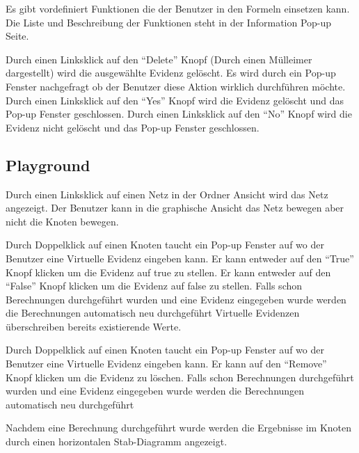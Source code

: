 \documentclass[parskip=full,11pt,twoside]{scrartcl}
\begin{document}
Es gibt vordefiniert Funktionen die der Benutzer in den Formeln einsetzen kann. Die Liste und Beschreibung der Funktionen steht in der Information Pop-up Seite.


Durch einen Linksklick auf den \enquote{Delete} Knopf (Durch einen Mülleimer dargestellt) wird die ausgewählte Evidenz gelöscht. Es wird durch ein Pop-up Fenster nachgefragt ob der Benutzer diese Aktion wirklich durchführen möchte.
Durch einen Linksklick auf den \enquote{Yes} Knopf wird die Evidenz gelöscht und das Pop-up Fenster geschlossen.
Durch einen Linksklick auf den \enquote{No} Knopf wird die Evidenz nicht gelöscht und das Pop-up Fenster geschlossen.

\subsection{Playground}

Durch einen Linksklick auf einen Netz in der Ordner Ansicht wird das Netz angezeigt. 
Der Benutzer kann in die graphische Ansicht das Netz bewegen aber nicht die Knoten bewegen.


Durch Doppelklick auf einen Knoten taucht ein Pop-up Fenster auf wo der Benutzer eine Virtuelle Evidenz eingeben kann.
Er kann entweder auf den \enquote{True} Knopf klicken um die Evidenz auf true zu stellen.
Er kann entweder auf den \enquote{False} Knopf klicken um die Evidenz auf false zu stellen.
Falls schon Berechnungen durchgeführt wurden und eine Evidenz eingegeben wurde werden die Berechnungen automatisch
neu durchgeführt
Virtuelle Evidenzen überschreiben bereits existierende Werte.


Durch Doppelklick auf einen Knoten taucht ein Pop-up Fenster auf wo der Benutzer eine Virtuelle Evidenz eingeben kann.
Er kann auf den \enquote{Remove} Knopf klicken um die Evidenz zu löschen.
Falls schon Berechnungen durchgeführt wurden und eine Evidenz eingegeben wurde werden die Berechnungen automatisch
neu durchgeführt


Nachdem eine Berechnung durchgeführt wurde werden die Ergebnisse im Knoten durch einen horizontalen Stab-Diagramm angezeigt.
\end{document}
